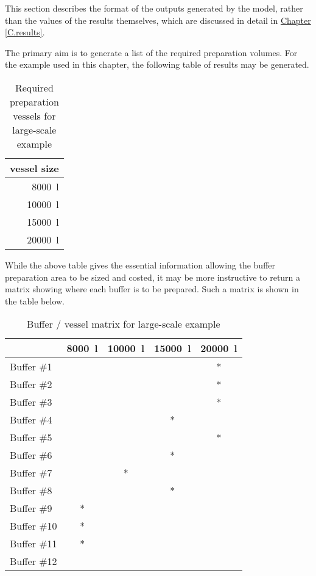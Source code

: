 This section describes the format of the outputs generated by the model, rather
than the values of the results themselves, which are discussed in detail in 
\hyperref[C.results]{Chapter \ref*{C.results}}.

The primary aim is to generate a list of the required preparation volumes.
For the example used in this chapter, the following table of results may be
generated.

\begin{table}[h!]
    \centering
    \caption{Required preparation vessels for large-scale example}
    \label{tbl.reqvessels}
    \begin{tabular}{r}
        vessel size\\ \hline
        \SI{8000}{\litre}\\
        \SI{10000}{\litre}\\
        \SI{15000}{\litre}\\
        \SI{20000}{\litre}\\
    \end{tabular}
\end{table}

While the above table gives the essential information allowing the buffer
preparation area to be sized and costed, it may be more instructive to return
a matrix showing where each buffer is to be prepared.
Such a matrix is shown in the table below.

\begin{table}[h!]
    \centering
    \caption{Buffer / vessel matrix for large-scale example}
    \label{tbl.bvmatrix}
    \begin{tabular}{l | c | c | c | c }
        & \SI{8000}{\litre} & \SI{10000}{\litre} & \SI{15000}{\litre} &
        \SI{20000}{\litre}\\ \hline
        Buffer \#1  &   &   &   & * \\
        Buffer \#2  &   &   &   & * \\
        Buffer \#3  &   &   &   & * \\
        Buffer \#4  &   &   & * &   \\
        Buffer \#5  &   &   &   & * \\
        Buffer \#6  &   &   & * &   \\
        Buffer \#7  &   & * &   &   \\
        Buffer \#8  &   &   & * &   \\
        Buffer \#9  & * &   &   &   \\
        Buffer \#10 & * &   &   &   \\
        Buffer \#11 & * &   &   &   \\
        Buffer \#12 &   &   &   &   \\
    \end{tabular}
\end{table}

